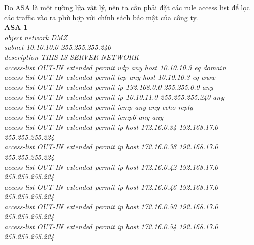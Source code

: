 \documentclass[a4paper, 12pt]{article}
\begin{document}
\hspace*{1cm}Do ASA là một tường lửa vật lý, nên ta cần phải đặt các rule access list để lọc các traffic vào ra phù hợp với chính sách bảo mật của công ty. \\
\hspace*{1cm}\textbf{ASA 1}\\
\hspace*{1cm}\textit{object network DMZ\\
\hspace*{1cm}subnet 10.10.10.0 255.255.255.240\\
\hspace*{1cm}description THIS IS SERVER NETWORK\\
\hspace*{1cm}access-list OUT-IN extended permit udp any host 10.10.10.3 eq domain\\
\hspace*{1cm}access-list OUT-IN extended permit tcp any host 10.10.10.3 eq www\\
\hspace*{1cm}access-list OUT-IN extended permit ip 192.168.0.0 255.255.0.0 any\\
\hspace*{1cm}access-list OUT-IN extended permit ip 10.10.11.0 255.255.255.240 any\\
\hspace*{1cm}access-list OUT-IN extended permit icmp any any echo-reply\\
\hspace*{1cm}access-list OUT-IN extended permit icmp6 any any\\
\hspace*{1cm}access-list OUT-IN extended permit ip host 172.16.0.34 192.168.17.0 255.255.255.224\\
\hspace*{1cm}access-list OUT-IN extended permit ip host 172.16.0.38 192.168.17.0 255.255.255.224\\
\hspace*{1cm}access-list OUT-IN extended permit ip host 172.16.0.42 192.168.17.0 255.255.255.224\\
\hspace*{1cm}access-list OUT-IN extended permit ip host 172.16.0.46 192.168.17.0 255.255.255.224\\
\hspace*{1cm}access-list OUT-IN extended permit ip host 172.16.0.50 192.168.17.0 255.255.255.224\\
\hspace*{1cm}access-list OUT-IN extended permit ip host 172.16.0.54 192.168.17.0 255.255.255.224\\
}
\end{document}
